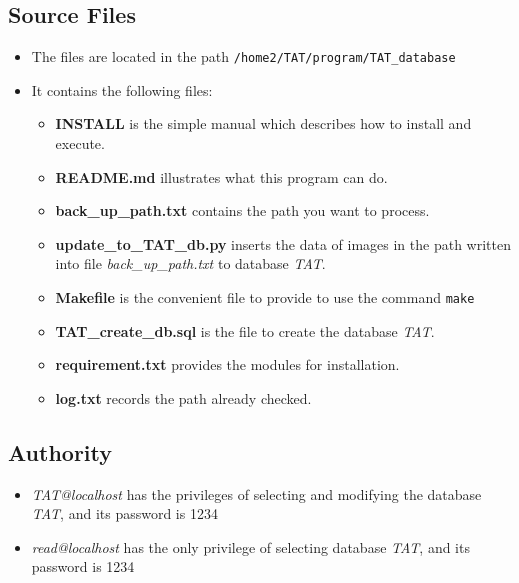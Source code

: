 \documentclass[12pt]{article}    %
\begin{document}
 \subsection{Source Files}	
 \begin{itemize}
  \item The files are located in the path \verb|/home2/TAT/program/TAT_database|
  \item It contains the following files:
  \begin{itemize}
  \item \textbf {INSTALL} is the simple manual which describes how to install and execute.
  \item \textbf {README.md} illustrates what this program can do.
  \item \textbf {back\_up\_path.txt} contains the path you want to process.
  \item \textbf {update\_to\_TAT\_db.py} inserts the data of images in the path written into file {\it back\_up\_path.txt} to database {\it TAT}.
  \item \textbf {Makefile} is the convenient file to provide to use the command \verb|make| 
  \item \textbf {TAT\_create\_db.sql} is the file to create the database {\it TAT}.
  \item \textbf {requirement.txt} provides the modules for installation.
  \item \textbf {log.txt} records the path already checked.
  \end{itemize}
  
 \end{itemize}


 \subsection{Authority}
 \begin{itemize}
  \item {\it TAT@localhost} has the privileges of selecting and modifying the database {\it TAT}, and its password is 1234
  \item {\it read@localhost} has the only privilege of selecting database {\it TAT}, and its password is 1234
 \end{itemize}
\end{document}
